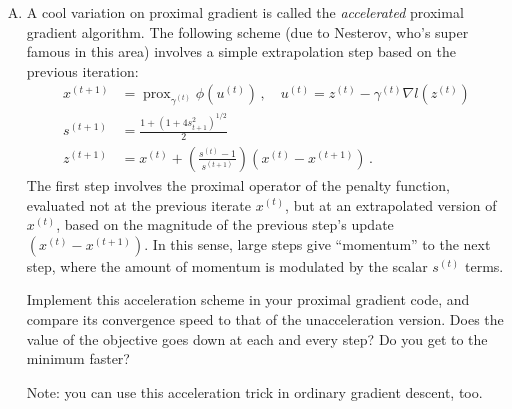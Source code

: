 \documentclass{mynotes}
\newcommand{\prox}{ \mathop{\mathrm{prox}} }
\begin{document}
\begin{enumerate}[(A)]
\item A cool variation on proximal gradient is called the \textit{accelerated} proximal gradient algorithm.   The following scheme (due to Nesterov, who's super famous in this area) involves a simple extrapolation step based on the previous iteration:
$$
\begin{aligned}
x^{(t+1)} &= \prox_{ \gamma^{(t)}} \phi(u^{(t)}) \, , \quad u^{(t)} =  z^{(t)} - \gamma^{(t)} \nabla l(z^{(t)})  \\
s^{(t+1)} &= \frac{1 + (1 + 4 s_{t+1}^2)^{1/2}}{2} \\
z^{(t+1)} &=  x^{(t)} + \left( \frac{s^{(t)} - 1}{s^{(t+1)}} \right) (x^{(t)} - x^{(t+1)}) \, .
\end{aligned}
$$
The first step involves the proximal operator of the penalty function, evaluated not at the previous iterate $x^{(t)}$, but at an extrapolated version of $x^{(t)}$, based on the magnitude of the previous step's update $(x^{(t)} - x^{(t+1)})$.  In this sense, large steps give ``momentum'' to the next step, where the amount of momentum is modulated by the scalar $s^{(t)}$ terms.

Implement this acceleration scheme in your proximal gradient code, and compare its convergence speed to that of the unacceleration version.  Does the value of the objective goes down at each and every step?  Do you get to the minimum faster?

Note: you can use this acceleration trick in ordinary gradient descent, too.

\end{enumerate}
\end{document}

